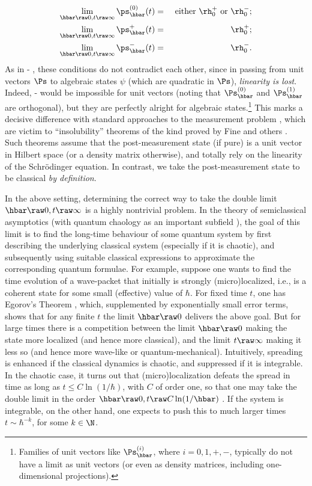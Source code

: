 \documentclass[12pt]{article}
\begin{document}
\begin{eqnarray}
\lim_{\hbar\raw 0,t\raw\infty} \ps^{(0)}_{\hbar}(t)&=& \mbox{ either } \rh_0^+ \mbox{ or }  \rh_0^-; \label{solcat}\\
{\lim_{\hbar\raw 0,t\raw\infty} \ps^+_{\hbar}(t)}&=& \rh_0^+;\label{solcat2} \\
{\lim_{\hbar\raw 0,t\raw\infty} \ps^-_{\hbar}(t)}&=& \rh_0^-. \label{solcat3}
\end{eqnarray}
As in  - ,  these conditions  do not contradict each other, since in passing from unit vectors $\Ps$ to algebraic states $\psi$ (which are quadratic in $\Ps$), \emph{linearity is lost}. Indeed, 
 -  would be impossible for unit vectors (noting that $\Ps_{\hbar}^{(0)}$ and $\Ps_{\hbar}^{(1)}$ are orthogonal), but they are perfectly alright for algebraic  states.\footnote{Families of unit vectors like $\Ps^{(i)}_{\hbar}$, where $i=0,1,+,-$, typically do not have a limit as unit vectors (or even as density matrices, including one-dimensional projections).} This marks a decisive difference with 
standard approaches to the measurement problem  \cite{BG, Bub,BLM},  which 
 are victim to ``insolubility'' theorems of the kind proved by Fine and others \cite{Brown,BLM,Fine}. Such theorems assume that the post-measurement state (if pure) is a unit vector in Hilbert space (or a density matrix otherwise), and totally rely on the linearity of the Schr\"{o}dinger equation. In contrast, we  take  the post-measurement state to be classical \emph{by definition}.
 
 In the above setting, determining the correct way to take the double limit $\hbar\raw 0,t\raw\infty$ is a highly nontrivial problem. In the theory of 
 semiclassical asymptotics \cite{Robert} (with quantum chaology as an important subfield \cite{BDB,Faure,Schubert,Zas}), the goal of this limit is to find the long-time behaviour of some quantum system by first describing the underlying classical system (especially if it is chaotic), and subsequently using suitable classical expressions to approximate the corresponding quantum formulae. For example, suppose one wants to find the time evolution of a wave-packet that initially is strongly (micro)localized, i.e., is a coherent state for some small (effective) value of $\hbar$.  For fixed time $t$, one has Egorov's Theorem , which, supplemented by exponentially small error terms, shows that for any finite $t$ the limit $\hbar\raw 0$ delivers the above goal.  But for large times there is a competition between the limit $\hbar\raw0$ making the state more localized (and hence more classical), and
 the limit  $t\raw\infty$ making it less so (and hence more wave-like or quantum-mechanical).  Intuitively, spreading is enhanced if the classical dynamics is chaotic, and suppressed if it is integrable. In the chaotic case, it turns out that (micro)localization defeats the spread in time as long as $t\leq C \ln(1/\hbar)$, with $C$ of order one, so that one may take the double limit in the order $\hbar\raw 0, t\raw  C \ln(1/\hbar)$ \cite{BGP,BR,CR}. 
 If the system is integrable, on the other hand, one expects to push this to much larger times $t\sim \hbar^{-k}$, for some $k\in\N$.
 
\end{document}
